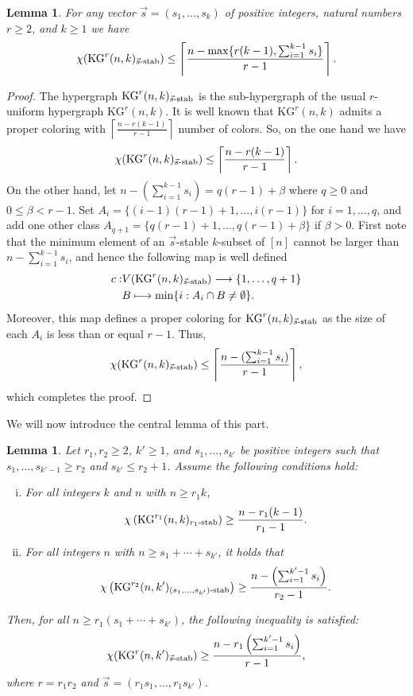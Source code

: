 \documentclass[preprint,12pt,3p]{elsarticle}
\newtheorem{lemma}[theorem]{Lemma}
\begin{document}
\begin{lemma}\label{lemma: coloring}
For any vector $\vec{s}=(s_1,\ldots, s_k)$ of positive integers, natural numbers $r\geq 2$, and $k\geq 1$ we have
\[
\chi (\mathrm{KG}^{r}(n,k)_{\vec{s}\textup{-stab}})\leq\left\lceil\frac{n-\max\{r(k-1),\sum_{i=1}^{k-1}s_i\}}{r-1}\right\rceil.
\]
\end{lemma}

\begin{proof}
The hypergraph $\mathrm{KG}^{r}(n,k)_{\vec{s}\textup{-stab}}$ is the sub-hypergraph of the usual $r$-uniform hypergraph $\mathrm{KG}^{r}(n,k)$. It is well known that $\mathrm{KG}^{r}(n,k)$ admits a proper coloring with $\left\lceil\frac{n-r(k-1)}{r-1}\right\rceil$ number of colors. So, on the one hand we have
\[
\chi (\mathrm{KG}^{r}(n,k)_{\vec{s}\textup{-stab}})\leq\left\lceil\frac{n-r(k-1)}{r-1}\right\rceil.
\]
On the other hand, let $n-(\sum_{i=1}^{k-1}s_i)=q(r-1)+\beta$ where $q\geq 0$ and $0\leq\beta < r-1$. Set 
$A_i=\{(i-1)(r-1)+1, \ldots, i(r-1)\}$ for $i=1, \ldots, q$, and add one other class $A_{q+1}=\{q(r-1)+1, \ldots, q(r-1)+\beta\}$ if $\beta > 0$. First note that the minimum element of an $\vec{s}$-stable $k$-subset of $[n]$ cannot be larger than $n-\sum_{i=1}^{k-1}s_i$, and hence the following map is well defined
\begin{align*}
  c :  & V(\mathrm{KG}^{r}(n,k)_{\vec{s}\textup{-stab}})\longrightarrow \{1, \ldots, q+1\}\\
  & B\longmapsto \min\{i : A_i\cap B\neq\emptyset\}.
\end{align*}
Moreover, this map defines a proper coloring for $\mathrm{KG}^{r}(n,k)_{\vec{s}\textup{-stab}}$ as the size of each $A_i$ is less than or equal $r-1$. Thus,
\[
\chi (\mathrm{KG}^{r}(n,k)_{\vec{s}\textup{-stab}})\leq\left\lceil\frac{n-(\sum_{i=1}^{k-1}s_i)}{r-1}\right\rceil,
\]
which completes the proof.
\end{proof}

We will now introduce the central lemma of this part.

\begin{lemma}\label{Lemma: Main} 
Let $r_1, r_2 \geq 2$, ${k'} \geq 1$, and $s_1, \ldots, s_{k'}$ be positive integers such that $s_1, \ldots, s_{k'-1} \geq r_2$ and $s_{k'}\leq r_2+1$. Assume the following conditions hold:
\begin{enumerate}[(i)]
    \item For all integers $k$ and $n$ with $n \geq r_1 k$, 
    \[ \chi \left(\mathrm{KG}^{r_1}(n,k)_{r_1\textup{-stab}}\right) \geq \frac{n - r_1 (k-1)}{r_1 - 1}. \]
    \item For all integers $n$ with $n \geq s_1 + \cdots + s_{k'}$, it holds that
    \[ \chi \left(\mathrm{KG}^{r_2}(n,k')_{(s_1, \ldots, s_{k'})\textup{-stab}}\right) \geq \frac{n - \left( \sum_{i=1}^{k'-1} s_i \right)}{r_2 - 1}. \]
\end{enumerate}
Then, for all $n \geq r_1(s_1 + \cdots + s_{k'})$, the following inequality is satisfied: 
\[ \chi (\mathrm{KG}^{r}(n,k')_{\vec{s}\textup{-stab}}) \geq \frac{n - r_1 \left( \sum_{i=1}^{k'-1} s_i \right)}{r - 1}, \] 
where $r = r_1 r_2$ and $\vec{s} = (r_1 s_1, \ldots, r_1 s_{k'})$. 
\end{lemma}
\end{document}
